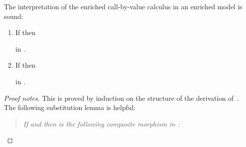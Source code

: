 \documentclass{LMCS}
\newcommand{\hide}[1]{}
\newenvironment{proofnotes}{\begin{proof}[Proof notes]}{\end{proof}}
\begin{document}
\begin{prop}
The interpretation of the enriched call-by-value calculus 
in an enriched model 
 is sound:
\begin{enumerate}
\item If  then 

in .
\item If  then 

in .
\end{enumerate}
\end{prop}
\begin{proofnotes}
This is proved by induction on the structure of the 
derivation of~.
The following substitution lemma is helpful:
\hide{\item If  and  
then  is the following composite  in :

}
\begin{quote}
\emph{If  and  
then  is the following composite morphism in :}

\end{quote}\vspace{-1.367\baselineskip}
\end{proofnotes}
\end{document}
